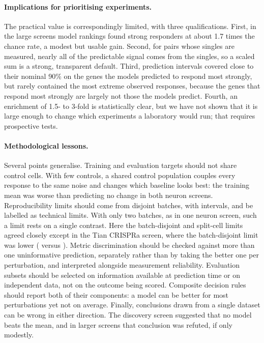 \paragraph{Implications for prioritising experiments.} The practical value is correspondingly limited, with three qualifications. First, in the large screens model rankings found strong responders at about 1.7 times the chance rate, a modest but usable gain. Second, for pairs whose singles are measured, nearly all of the predictable signal comes from the singles, so a scaled sum is a strong, transparent default. Third, prediction intervals covered close to their nominal 90\% on the genes the models predicted to respond most strongly, but rarely contained the most extreme observed responses, because the genes that respond most strongly are largely not those the models predict. Fourth, an enrichment of 1.5- to 3-fold is statistically clear, but we have not shown that it is large enough to change which experiments a laboratory would run; that requires prospective tests.

\paragraph{Methodological lessons.} Several points generalise. Training and evaluation targets should not share control cells. With few controls, a shared control population couples every response to the same noise and changes which baseline looks best: the training mean was worse than predicting no change in both neuron screens. Reproducibility limits should come from disjoint batches, with intervals, and be labelled as technical limits. With only two batches, as in one neuron screen, such a limit rests on a single contrast. Here the batch-disjoint and split-cell limits agreed closely except in the Tian CRISPRa screen, where the batch-disjoint limit was lower (\numCeilBatchTianCrispra{} versus \numCeilHalfTianCrispra). Metric discrimination should be checked against more than one uninformative prediction, separately rather than by taking the better one per perturbation, and interpreted alongside measurement reliability. Evaluation subsets should be selected on information available at prediction time or on independent data, not on the outcome being scored. Composite decision rules should report both of their components: a model can be better for most perturbations yet not on average. Finally, conclusions drawn from a single dataset can be wrong in either direction. The discovery screen suggested that no model beats the mean, and in larger screens that conclusion was refuted, if only modestly.

